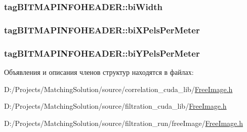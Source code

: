 \hypertarget{structtag_b_i_t_m_a_p_i_n_f_o_h_e_a_d_e_r_4bbc605184be98c4da36f707f7695e0f}{
\subsubsection[{biWidth}]{ {\bf tagBITMAPINFOHEADER::biWidth}}}
\label{structtag_b_i_t_m_a_p_i_n_f_o_h_e_a_d_e_r_4bbc605184be98c4da36f707f7695e0f}


\hypertarget{structtag_b_i_t_m_a_p_i_n_f_o_h_e_a_d_e_r_e363738b6e92248a7be41f4e7ed55c54}{
\subsubsection[{biXPelsPerMeter}]{ {\bf tagBITMAPINFOHEADER::biXPelsPerMeter}}}
\label{structtag_b_i_t_m_a_p_i_n_f_o_h_e_a_d_e_r_e363738b6e92248a7be41f4e7ed55c54}


\hypertarget{structtag_b_i_t_m_a_p_i_n_f_o_h_e_a_d_e_r_c6226594275d045ff0d03849945d920f}{
\subsubsection[{biYPelsPerMeter}]{ {\bf tagBITMAPINFOHEADER::biYPelsPerMeter}}}
\label{structtag_b_i_t_m_a_p_i_n_f_o_h_e_a_d_e_r_c6226594275d045ff0d03849945d920f}




Объявления и описания членов структур находятся в файлах:\begin{CompactItemize}
\item 
D:/Projects/MatchingSolution/source/correlation\_\-cuda\_\-lib/\hyperlink{correlation__cuda__lib_2_free_image_8h}{FreeImage.h}\item 
D:/Projects/MatchingSolution/source/filtration\_\-cuda\_\-lib/\hyperlink{filtration__cuda__lib_2_free_image_8h}{FreeImage.h}\item 
D:/Projects/MatchingSolution/source/filtration\_\-run/freeImage/\hyperlink{filtration__run_2free_image_2_free_image_8h}{FreeImage.h}\end{CompactItemize}
